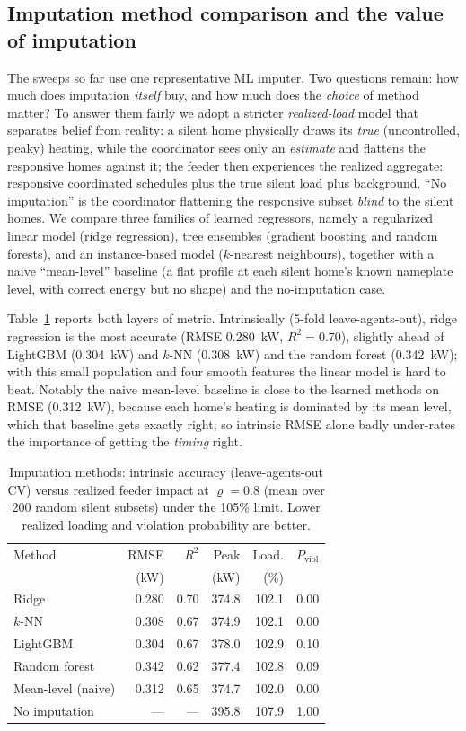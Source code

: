 \subsection{Imputation method comparison and the value of imputation}
The sweeps so far use one representative ML imputer. Two questions remain: how
much does imputation \emph{itself} buy, and how much does the \emph{choice} of
method matter? To answer them fairly we adopt a stricter \emph{realized-load}
model that separates belief from reality: a silent home physically draws its
\emph{true} (uncontrolled, peaky) heating, while the coordinator sees only an
\emph{estimate} and flattens the responsive homes against it; the feeder then
experiences the realized aggregate: responsive coordinated schedules plus the
true silent load plus background. ``No imputation'' is the coordinator flattening
the responsive subset \emph{blind} to the silent homes. We compare three families
of learned regressors, namely a regularized linear model (ridge regression), tree
ensembles (gradient boosting and random forests), and an instance-based model
($k$-nearest neighbours), together with a naive ``mean-level'' baseline (a flat
profile at each silent home's known nameplate level, with correct energy but no shape)
and the no-imputation case.

Table~\ref{tab:imputers} reports both layers of metric. Intrinsically (5-fold
leave-agents-out), ridge regression is the most accurate (RMSE 0.280~kW,
$R^2 = 0.70$), slightly ahead of LightGBM (0.304~kW) and $k$-NN (0.308~kW) and the
random forest (0.342~kW); with this small population and four smooth features the
linear model is hard to beat. Notably the naive mean-level baseline is close to
the learned methods on RMSE (0.312~kW), because each home's heating is
dominated by its mean level, which that baseline gets exactly right; so
intrinsic RMSE alone badly under-rates the importance of getting the \emph{timing}
right.

\begin{table}[t]
\centering
\caption{Imputation methods: intrinsic accuracy (leave-agents-out CV) versus
realized feeder impact at $\varrho = 0.8$ (mean over 200 random silent subsets)
under the 105\% limit. Lower realized loading and violation probability are
better.}
\label{tab:imputers}
\begin{tabular}{@{}lrrrrr@{}}
\toprule
Method & RMSE & $R^2$ & Peak & Load. & $P_{\mathrm{viol}}$ \\
 & (kW) & & (kW) & (\%) & \\
\midrule
Ridge              & 0.280 & 0.70 & 374.8 & 102.1 & 0.00 \\
$k$-NN             & 0.308 & 0.67 & 374.9 & 102.1 & 0.00 \\
LightGBM           & 0.304 & 0.67 & 378.0 & 102.9 & 0.10 \\
Random forest      & 0.342 & 0.62 & 377.4 & 102.8 & 0.09 \\
Mean-level (naive) & 0.312 & 0.65 & 374.7 & 102.0 & 0.00 \\
No imputation      & ---   & ---  & 395.8 & 107.9 & 1.00 \\
\bottomrule
\end{tabular}
\end{table}

